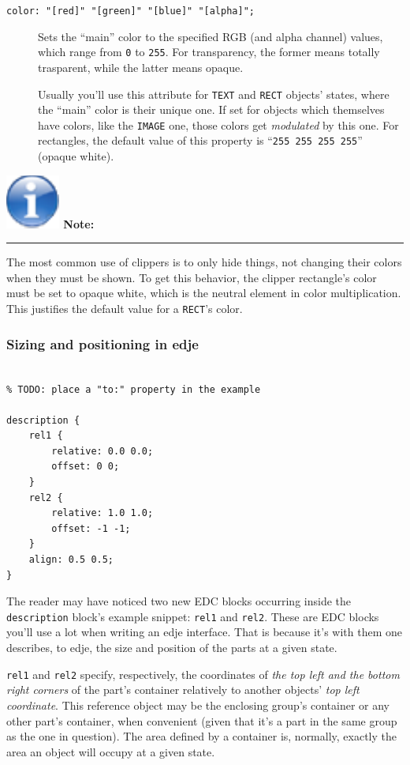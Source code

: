 \documentclass[a4paper]{profusion}
\newenvironment{myboxenv}[1]
  {
    \begin{flushright}
      \begin{boxedminipage}{0.9\textwidth}
        \textbf{%
          \large #1:}

        \hspace{-5pt}\rule{0.3\textwidth}{0.5pt}
        \begin{center}
          \begin{minipage}{0.95\textwidth}

            \small%
         }
          {
          \end{minipage}
        \end{center}
      \end{boxedminipage}
    \end{flushright}
 }
\newenvironment{note}
  {
    \begin{myboxenv}{
        \includegraphics[scale=0.4]{images/note.pdf}
        Note}
   }
    {
    \end{myboxenv}
 }
\begin{document}
\begin{description}
\item[\texttt{color: "[red]" "[green]" "[blue]" "[alpha]";}] Sets the
  ``main'' color to the specified RGB (and alpha channel) values,
  which range from \texttt{0} to \texttt{255}. For transparency, the
  former means totally trasparent, while the latter means opaque.

  Usually you'll use this attribute for \texttt{TEXT} and
  \texttt{RECT} objects' states, where the ``main'' color is their
  unique one. If set for objects which themselves have colors, like
  the \texttt{IMAGE} one, those colors get \emph{modulated} by this
  one. For rectangles, the default value of this property is
  ``\texttt{255 255 255 255}'' (opaque white).
\end{description}

\begin{note}
The most common use of clippers is to only hide things, not changing
their colors when they must be shown. To get this behavior, the
clipper rectangle's color must be set to opaque white, which is the
neutral element in color multiplication. This justifies the default
value for a \texttt{RECT}'s color.
\end{note}

\subsubsection{Sizing and positioning in edje}
\label{sec:positioning}

\begin{lstlisting}

% TODO: place a "to:" property in the example

description {
    rel1 {
        relative: 0.0 0.0;
        offset: 0 0;
    }
    rel2 {
        relative: 1.0 1.0;
        offset: -1 -1;
    }
    align: 0.5 0.5;
}
\end{lstlisting}

The reader may have noticed two new EDC blocks occurring inside the
\texttt{description} block's example snippet: \texttt{rel1} and
\texttt{rel2}. These are EDC blocks you'll use a lot when writing an
edje interface. That is because it's with them one describes, to edje,
the size and position of the parts at a given state.

\texttt{rel1} and \texttt{rel2} specify, respectively, the coordinates
of \emph{the top left and the bottom right corners} of the part's
container relatively to another objects' \emph{top left coordinate}.
This reference object may be the enclosing group's container or any
other part's container, when convenient (given that it's a part in the
same group as the one in question). The area defined by a container
is, normally, exactly the area an object will occupy at a given state.
\end{document}

